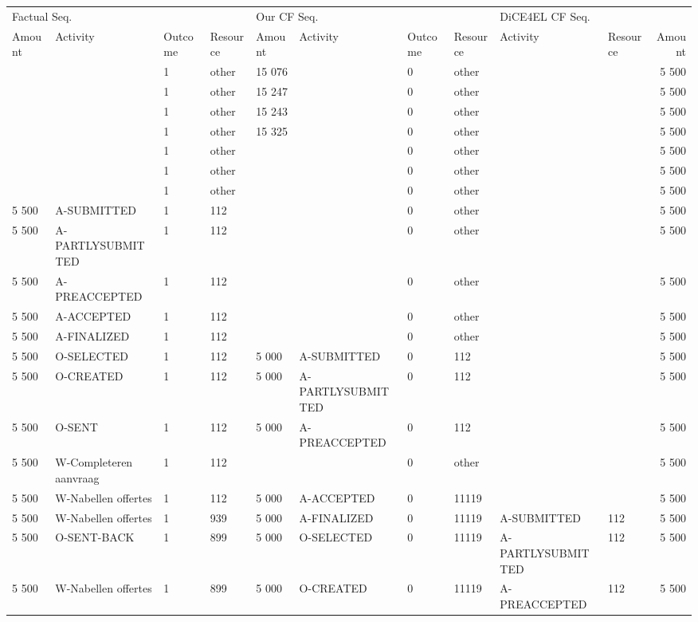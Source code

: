 \begin{tabular}{llllllllllr}
\toprule
\multicolumn{4}{l}{Factual Seq.} & \multicolumn{4}{l}{Our CF Seq.} & \multicolumn{3}{l}{DiCE4EL CF Seq.} \\
Amount & Activity & Outcome & Resource & Amount & Activity & Outcome & Resource & Activity & Resource & Amount \\
\midrule
 &  & 1 & other & 15 076 &  & 0 & other &  &  & 5 500 \\
 &  & 1 & other & 15 247 &  & 0 & other &  &  & 5 500 \\
 &  & 1 & other & 15 243 &  & 0 & other &  &  & 5 500 \\
 &  & 1 & other & 15 325 &  & 0 & other &  &  & 5 500 \\
 &  & 1 & other &  &  & 0 & other &  &  & 5 500 \\
 &  & 1 & other &  &  & 0 & other &  &  & 5 500 \\
 &  & 1 & other &  &  & 0 & other &  &  & 5 500 \\
5 500 & A-SUBMITTED & 1 & 112 &  &  & 0 & other &  &  & 5 500 \\
5 500 & A-PARTLYSUBMITTED & 1 & 112 &  &  & 0 & other &  &  & 5 500 \\
5 500 & A-PREACCEPTED & 1 & 112 &  &  & 0 & other &  &  & 5 500 \\
5 500 & A-ACCEPTED & 1 & 112 &  &  & 0 & other &  &  & 5 500 \\
5 500 & A-FINALIZED & 1 & 112 &  &  & 0 & other &  &  & 5 500 \\
5 500 & O-SELECTED & 1 & 112 & 5 000 & A-SUBMITTED & 0 & 112 &  &  & 5 500 \\
5 500 & O-CREATED & 1 & 112 & 5 000 & A-PARTLYSUBMITTED & 0 & 112 &  &  & 5 500 \\
5 500 & O-SENT & 1 & 112 & 5 000 & A-PREACCEPTED & 0 & 112 &  &  & 5 500 \\
5 500 & W-Completeren aanvraag & 1 & 112 &  &  & 0 & other &  &  & 5 500 \\
5 500 & W-Nabellen offertes & 1 & 112 & 5 000 & A-ACCEPTED & 0 & 11119 &  &  & 5 500 \\
5 500 & W-Nabellen offertes & 1 & 939 & 5 000 & A-FINALIZED & 0 & 11119 & A-SUBMITTED & 112 & 5 500 \\
5 500 & O-SENT-BACK & 1 & 899 & 5 000 & O-SELECTED & 0 & 11119 & A-PARTLYSUBMITTED & 112 & 5 500 \\
5 500 & W-Nabellen offertes & 1 & 899 & 5 000 & O-CREATED & 0 & 11119 & A-PREACCEPTED & 112 & 5 500 \\

\end{tabular}
